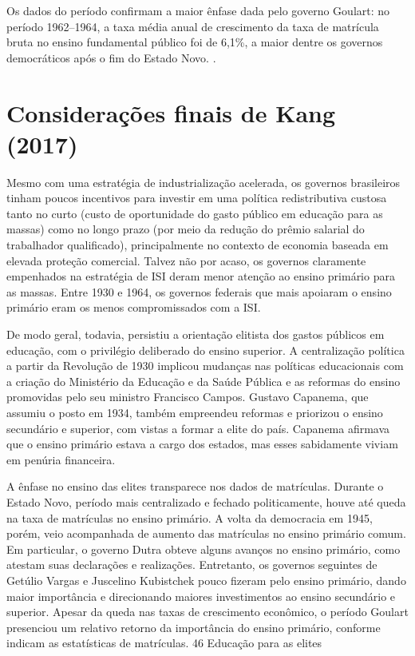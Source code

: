\documentclass[a4paper,12pt]{article}
\begin{document}
Os dados do período confirmam a maior ênfase dada pelo governo Goulart: no período 1962–1964, a taxa média anual de crescimento da taxa de matrícula bruta no ensino fundamental público foi de 6,1\%, a maior dentre os governos democráticos após o fim do Estado Novo. \cite{kang}.


\section*{Considerações finais de Kang (2017)}

Mesmo com uma estratégia de industrialização acelerada, os governos brasileiros tinham poucos incentivos para investir em uma política redistributiva custosa tanto no curto (custo de oportunidade do gasto público em educação para as massas) como no longo prazo (por meio da redução do prêmio salarial do trabalhador qualificado), principalmente no contexto de economia baseada em elevada proteção comercial. Talvez não por acaso, os governos claramente empenhados na estratégia de ISI deram menor atenção ao ensino primário para as massas. Entre 1930 e 1964, os governos federais que mais apoiaram o ensino primário eram os menos compromissados com a ISI.

De modo geral, todavia, persistiu a orientação elitista dos gastos públicos em educação, com o privilégio deliberado do ensino superior. A centralização política a partir da Revolução de 1930 implicou mudanças nas políticas educacionais com a criação do Ministério da Educação e da Saúde Pública e as reformas do ensino promovidas pelo seu ministro Francisco Campos. Gustavo Capanema, que assumiu o posto em 1934, também empreendeu reformas e priorizou o ensino secundário e superior, com vistas a formar a elite do país. Capanema afirmava que o ensino primário estava a cargo dos estados, mas esses sabidamente viviam em penúria financeira.

A ênfase no ensino das elites transparece nos dados de matrículas. Durante o Estado Novo, período mais centralizado e fechado politicamente, houve até queda na taxa de matrículas no ensino primário. A volta da democracia em 1945, porém, veio acompanhada de aumento das matrículas no ensino primário comum. Em particular, o governo Dutra obteve alguns avanços no ensino primário, como atestam suas declarações e realizações. Entretanto, os governos seguintes de Getúlio Vargas e Juscelino Kubistchek pouco fizeram pelo ensino primário, dando maior importância e direcionando maiores investimentos ao ensino secundário e superior. Apesar da queda nas taxas de crescimento econômico, o período Goulart presenciou um relativo retorno da importância do ensino primário, conforme indicam as estatísticas de matrículas.
46 Educação para as elites
\end{document}
